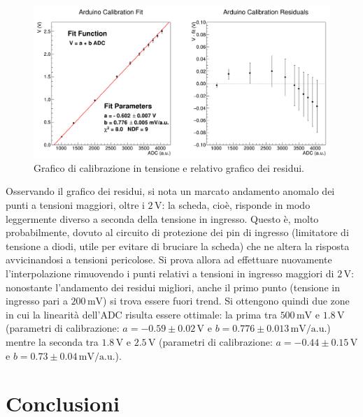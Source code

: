 \documentclass[a4paper,11pt]{article} %
\begin{document}
\begin{figure}[H]
	\centering
	\includegraphics[width=\linewidth]{../Arduino/Plots/calib_function.png}
	\caption{Grafico di calibrazione in tensione e relativo grafico dei residui.}
	\label{i:ar_calib}
\end{figure}

\noindent Osservando il grafico dei residui, si nota un marcato andamento anomalo dei punti a tensioni maggiori, oltre i
$2\,\si{\volt}$: la scheda, cioè, risponde in modo leggermente diverso a seconda della tensione in ingresso. Questo è,
molto probabilmente, dovuto al circuito di protezione dei pin di ingresso (limitatore di tensione a diodi, utile per
evitare di bruciare la scheda) che ne altera la risposta avvicinandosi a tensioni pericolose. Si prova allora ad
effettuare nuovamente l'interpolazione rimuovendo i punti relativi a tensioni in ingresso maggiori di $2\,\si{\volt}$:
nonostante l'andamento dei residui migliori, anche il primo punto (tensione in ingresso pari a $200\,\si{\mV}$) si trova
essere fuori trend. Si ottengono quindi due zone in cui la linearità dell'ADC risulta essere ottimale: la prima tra
$500\,\si{\mV}$ e $1.8\,\si{\volt}$ (parametri di calibrazione: $a = -0.59 \pm 0.02 \, \si{\V}$ e $b = 0.776 \pm 0.013
\,\si{\mV}/\text{a.u.}$) mentre la seconda tra $1.8\,\si{\volt}$ e $2.5\,\si{\volt}$ (parametri di calibrazione: $a =
-0.44 \pm 0.15 \, \si{\V}$ e $b = 0.73 \pm 0.04 \,\si{\mV}/\text{a.u.}$).




\section{Conclusioni}
\end{document}
